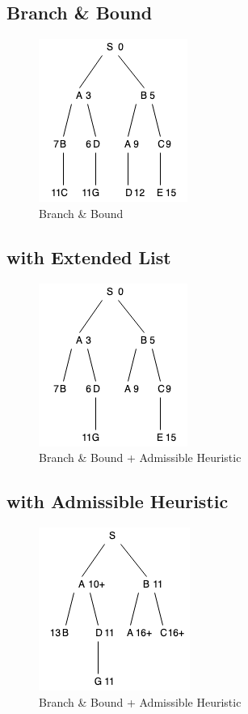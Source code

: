 \documentclass[12pt]{book}
\begin{document}
\subsection{Branch \& Bound}
\begin{figure}[ht]
	\centering
	\includegraphics[scale=1]{Figure/Figure5_2.png}
	\caption{Branch \& Bound}
\end{figure}
\newpage
\subsection{with Extended List}
\begin{figure}[ht]
	\centering
	\includegraphics[scale=1]{Figure/Figure5_3.png}
	\caption{Branch \& Bound + Admissible Heuristic}
\end{figure}
\subsection{with Admissible Heuristic}
\begin{figure}[ht]
	\centering
	\includegraphics[scale=1]{Figure/Figure5_4.png}
	\caption{Branch \& Bound + Admissible Heuristic}
\end{figure}
\newpage
\end{document}
